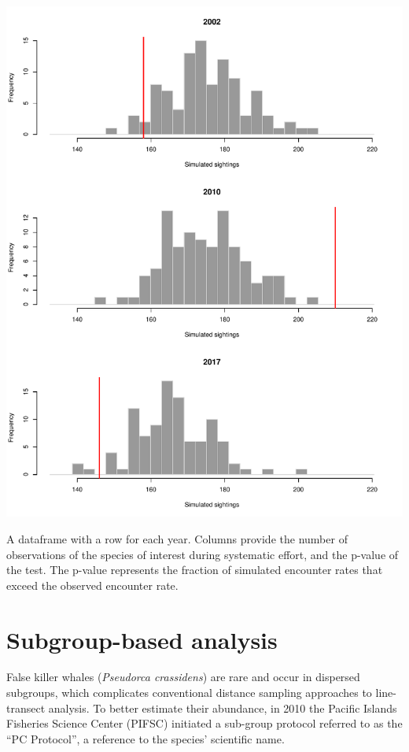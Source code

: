 \documentclass[
]{book}
\begin{document}
\includegraphics{figures/unnamed-chunk-275-1.pdf}

A dataframe with a row for each year. Columns provide the number of observations of the species of interest during systematic effort, and the p-value of the test. The p-value represents the fraction of simulated encounter rates that exceed the observed encounter rate.

\hypertarget{subgroups2}{%
\chapter{Subgroup-based analysis}\label{subgroups2}}

False killer whales (\emph{Pseudorca crassidens}) are rare and occur in dispersed subgroups, which complicates conventional distance sampling approaches to line-transect analysis. To better estimate their abundance, in 2010 the Pacific Islands Fisheries Science Center (PIFSC) initiated a sub-group protocol referred to as the ``PC Protocol'', a reference to the species' scientific name.
\end{document}
